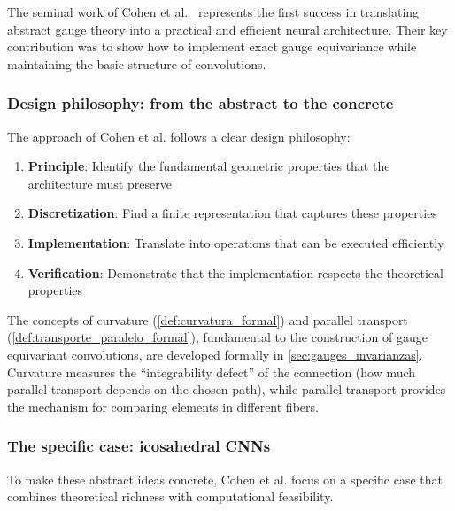 The seminal work of Cohen et al.~\citep{cohen2019gaugeequivariantconvolutional} represents the first success in translating abstract gauge theory into a practical and efficient neural architecture. Their key contribution was to show how to implement exact gauge equivariance while maintaining the basic structure of convolutions.

\subsubsection{Design philosophy: from the abstract to the concrete}

The approach of Cohen et al. follows a clear design philosophy:
\begin{enumerate}
    \item \textbf{Principle}: Identify the fundamental geometric properties that the architecture must preserve
    \item \textbf{Discretization}: Find a finite representation that captures these properties
    \item \textbf{Implementation}: Translate into operations that can be executed efficiently
    \item \textbf{Verification}: Demonstrate that the implementation respects the theoretical properties
\end{enumerate}

The concepts of curvature (\autoref{def:curvatura_formal}) and parallel transport (\autoref{def:transporte_paralelo_formal}), fundamental to the construction of gauge equivariant convolutions, are developed formally in \autoref{sec:gauges_invarianzas}. Curvature measures the ``integrability defect'' of the connection (how much parallel transport depends on the chosen path), while parallel transport provides the mechanism for comparing elements in different fibers.

\subsubsection{The specific case: icosahedral CNNs}

To make these abstract ideas concrete, Cohen et al. focus on a specific case that combines theoretical richness with computational feasibility.

